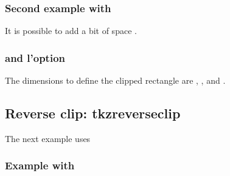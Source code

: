 \subsubsection{Second example with }

\begin{tkzexample}[latex=8cm,small]
\end{tkzexample}
It is possible to add a bit of space .

\subsubsection{ and l'option }

The dimensions to define the clipped rectangle are ,
,  and .

\begin{tkzexample}[latex=8cm,small]
\end{tkzexample}

\subsection{Reverse clip: tkzreverseclip}

The next example uses

\begin{tkzltxexample}[]
   \def\tkzClipOutPolygon(#1,#2){\clip[tkzreserveclip] (#1)
                 \foreach \pt in {#2}{--(\pt)}--cycle;
              }
\end{tkzltxexample}

\subsubsection{Example with }

